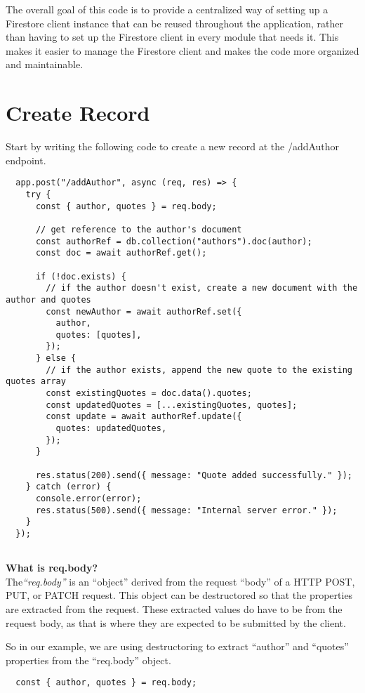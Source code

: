\documentclass{article}
\begin{document}
The overall goal of this code is to provide a centralized way of setting up a Firestore client instance that can be reused throughout the application, rather than having to set up the Firestore client in every module that needs it.
 This makes it easier to manage the Firestore client and makes the code more organized and maintainable.

\newpage
 \section[short]{Create Record}
Start by writing the following code to create a new record at the /addAuthor endpoint.
\begin{verbatim}
  app.post("/addAuthor", async (req, res) => {
    try {
      const { author, quotes } = req.body;
  
      // get reference to the author's document
      const authorRef = db.collection("authors").doc(author);
      const doc = await authorRef.get();
  
      if (!doc.exists) {
        // if the author doesn't exist, create a new document with the author and quotes
        const newAuthor = await authorRef.set({
          author,
          quotes: [quotes],
        });
      } else {
        // if the author exists, append the new quote to the existing quotes array
        const existingQuotes = doc.data().quotes;
        const updatedQuotes = [...existingQuotes, quotes];
        const update = await authorRef.update({
          quotes: updatedQuotes,
        });
      }
  
      res.status(200).send({ message: "Quote added successfully." });
    } catch (error) {
      console.error(error);
      res.status(500).send({ message: "Internal server error." });
    }
  });
  
\end{verbatim}
\newpage
\textbf{What is req.body?}\\ 

The\textit{``req.body''} is an ``object'' derived from the request ``body'' of a HTTP POST, PUT, or PATCH request.
This object can be destructored so that the properties are extracted from the request. These extracted values do have to be from the request body, as that is where they are expected to be submitted by the client.


So in our example, we are using destructoring to extract ``author'' and  ``quotes'' properties from the ``req.body'' object.

\begin{verbatim}
  const { author, quotes } = req.body;
\end{verbatim}
\end{document}
